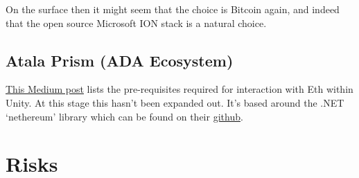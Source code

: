On the surface then it might seem that the choice is Bitcoin again, and indeed that the open source Microsoft ION stack is a natural choice. 

\subsection{Atala Prism (ADA Ecosystem)}
\href{https://medium.com/coinmonks/part-2-using-nethereum-in-unity-5b09f2d8c718}{This Medium post} lists the pre-requisites required for interaction with Eth within Unity. At this stage this hasn't been expanded out. It's based around the .NET `nethereum' library which can be found on their \href{https://github.com/Nethereum/Nethereum}{github}.    
   
  

\section{Risks}


